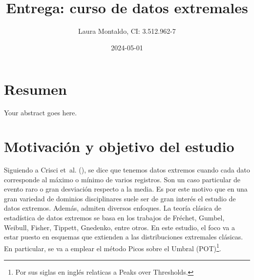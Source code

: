 \documentclass[
  12pt]{article}
\title{Entrega: curso de datos extremales}
\author{Laura Montaldo, CI: 3.512.962-7}
\date{2024-05-01}
\begin{document}
\maketitle

\newtheorem{theorem}{Teorema}
\newtheorem{mydefinition}{Definición}
\newtheorem{observation}{Observación}
\newtheorem{Corolario}{Corolario}

\newpage

\thispagestyle{empty}

\maketitle

\newpage

\tableofcontents

\newpage

\section{Resumen}\label{resumen}

Your abstract goes here.

\newpage

\section{Motivación y objetivo del
estudio}\label{motivaciuxf3n-y-objetivo-del-estudio}

Siguiendo a Crisci et~al. (), se dice
que tenemos datos extremos cuando cada dato corresponde al máximo o
mínimo de varios registros. Son un caso particular de evento raro o gran
desviación respecto a la media. Es por este motivo que en una gran
variedad de dominios disciplinares suele ser de gran interés el estudio
de datos extremos. Además, admiten diversos enfoques. La teoría clásica
de estadística de datos extremos se basa en los trabajos de Fréchet,
Gumbel, Weibull, Fisher, Tippett, Gnedenko, entre otros. En este
estudio, el foco va a estar puesto en esquemas que extienden a las
distribuciones extremales clásicas. En particular, se va a emplear el
método Picos sobre el Umbral
(POT)\footnote{Por sus siglas en inglés relaticas a  Peaks over Thresholds.}.
\end{document}
